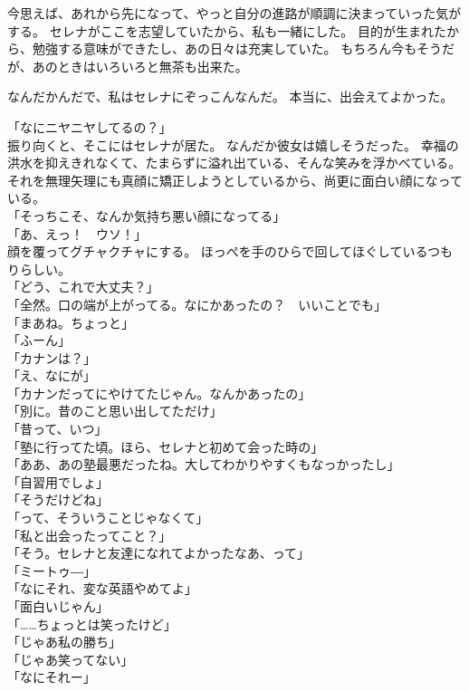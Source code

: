 \documentclass[../IHMain]{subfiles}
\begin{document}
今思えば、あれから先になって、やっと自分の進路が順調に決まっていった気がする。
セレナがここを志望していたから、私も一緒にした。
目的が生まれたから、勉強する意味ができたし、あの日々は充実していた。
もちろん今もそうだが、あのときはいろいろと無茶も出来た。

なんだかんだで、私はセレナにぞっこんなんだ。
本当に、出会えてよかった。

「なにニヤニヤしてるの？」\\
振り向くと、そこにはセレナが居た。
なんだか彼女は嬉しそうだった。
幸福の洪水を抑えきれなくて、たまらずに溢れ出ている、そんな笑みを浮かべている。
それを無理矢理にも真顔に矯正しようとしているから、尚更に面白い顔になっている。\\
「そっちこそ、なんか気持ち悪い顔になってる」\\
「あ、えっ！　ウソ！」\\
顔を覆ってグチャクチャにする。
ほっぺを手のひらで回してほぐしているつもりらしい。\\
「どう、これで大丈夫？」\\
「全然。口の端が上がってる。なにかあったの？　いいことでも」\\
「まあね。ちょっと」\\
「ふーん」\\
「カナンは？」\\
「え、なにが」\\
「カナンだってにやけてたじゃん。なんかあったの」\\
「別に。昔のこと思い出してただけ」\\
「昔って、いつ」\\
「塾に行ってた頃。ほら、セレナと初めて会った時の」\\
「ああ、あの塾最悪だったね。大してわかりやすくもなっかったし」\\
「自習用でしょ」\\
「そうだけどね」\\
「って、そういうことじゃなくて」\\
「私と出会ったってこと？」\\
「そう。セレナと友達になれてよかったなあ、って」\\
「ミートゥ―」\\
「なにそれ、変な英語やめてよ」\\
「面白いじゃん」\\
「……ちょっとは笑ったけど」\\
「じゃあ私の勝ち」\\
「じゃあ笑ってない」\\
「なにそれー」\\
\end{document}
